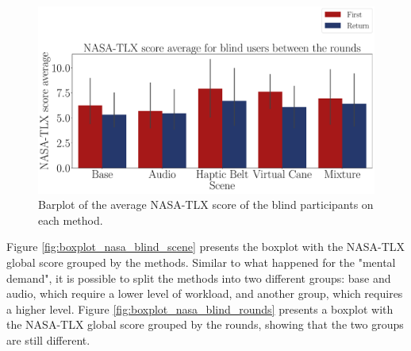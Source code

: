 \begin{figure}[!htb]
    \centering
    \includegraphics[width = \textwidth]{Resultados/Nasa/Figuras/pdf/barplot_nasa_avg_5_scene_blind.pdf}
    \caption{Barplot of the average NASA-TLX score of the blind participants on each method.}
    \label{fig:barplot_nasa_avg_5_scene_blind}
\end{figure}

Figure \ref{fig:boxplot_nasa_blind_scene} presents the boxplot with the NASA-TLX global score grouped by the methods. Similar to what happened for the "mental demand", it is possible to split the methods into two different groups: base and audio, which require a lower level of workload, and another group, which requires a higher level. Figure \ref{fig:boxplot_nasa_blind_rounds} presents a boxplot with the NASA-TLX global score grouped by the rounds, showing that the two groups are still different. 

